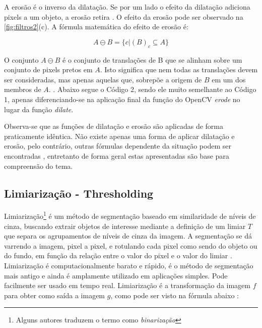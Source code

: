 

A erosão é o inverso da dilatação. Se por um lado o efeito da dilatação adiciona pixels a um objeto, a erosão retira \cite{parker10@algorithms}. O efeito da erosão pode ser observado na \autoref{fig:filtros2}(c). A fórmula matemática do efeito de erosão é:

\[ A \ominus B = \{c|(B)_c \subseteq A\} \]

O conjunto $A \ominus B$ é o conjunto de translações de B que se alinham sobre um conjunto de pixels pretos em $A$. Isto significa que nem todas as translações devem ser consideradas, mas apenas aquelas que, sobrepõe a origem de $B$ em um dos membros de $A$. \cite{parker10@algorithms}. Abaixo segue o Código 2, sendo ele muito semelhante ao Código 1, apenas diferenciando-se na aplicação final da função do OpenCV \textit{erode} no lugar da função \textit{dilate}.



Observa-se que as funções de dilatação e erosão são aplicadas de forma praticamente idêntica. Não existe apenas uma forma de aplicar dilatação e erosão, pelo contrário, outras fórmulas dependente da situação podem ser encontradas \cite{parker10@algorithms}, entretanto de forma geral estas apresentadas são base para compreensão do tema.


\subsection{Limiarização - Thresholding}

Limiarização\footnote{Alguns autores traduzem o termo como \textit{binarização}} é um método de segmentação baseado em similaridade de níveis de cinza, buscando extrair objetos de interesse mediante a definição de um limiar $T$ que separa os agrupamentos de níveis de cinza da imagem. A segmentação se dá varrendo a imagem, pixel a pixel, e rotulando cada pixel como sendo do objeto ou do fundo, em função da relação entre o valor do pixel e o valor do limiar \cite{IntroProcessDigIMG}. Limiarização é computacionalmente barato e rápido, é o método de segmentação mais antigo e ainda é amplamente utilizado em aplicações simples. Pode facilmente ser usado em tempo real. Limiarização é a transformação da imagem $f$ para obter como saída a imagem $g$, como pode ser visto na fórmula abaixo \cite{sonka2014image}:

